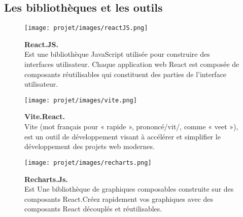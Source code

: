 \subsection{Les bibliothèques et les outils}
\begin{figure}[H]
    \centering
    \begin{minipage}[c]{0.3\textwidth}
        \texttt{[image: projet/images/reactJS.png]}
    \end{minipage}
    \hspace{1cm}
    \begin{minipage}[c]{0.6\textwidth}
        \textbf{React.JS.}\\[0.5em]
        Est une bibliothèque JavaScript utilisée pour construire des interfaces utilisateur. Chaque application web React est composée de composants réutilisables qui constituent des parties de l’interface utilisateur.\cite{ref16}
    \end{minipage}
\end{figure}
\vspace{0.5cm}
\begin{figure}[H]
    \centering
    \begin{minipage}[c]{0.3\textwidth}
        \texttt{[image: projet/images/vite.png]}
    \end{minipage}
    \hspace{1cm}
    \begin{minipage}[c]{0.6\textwidth}
        \textbf{Vite.React.}\\[0.5em]
        Vite (mot français pour « rapide », prononcé/vit/, comme « veet »), est un outil de développement visant à accélérer et simplifier le développement des projets web modernes.\cite{ref24}
    \end{minipage}
\end{figure}
\vspace{0.5cm}

\begin{figure}[H]
    \centering
    \begin{minipage}[c]{0.3\textwidth}
        \texttt{[image: projet/images/recharts.png]}
    \end{minipage}
    \hspace{1cm}
    \begin{minipage}[c]{0.6\textwidth}
        \textbf{Recharts.Js.}\\[0.5em]
    Est Une bibliothèque de graphiques composables construite sur des composants React.Créez rapidement vos graphiques avec des composants React découplés et réutilisables. \cite{ref17}
    \end{minipage}
\end{figure}
\vspace{0.5cm}

